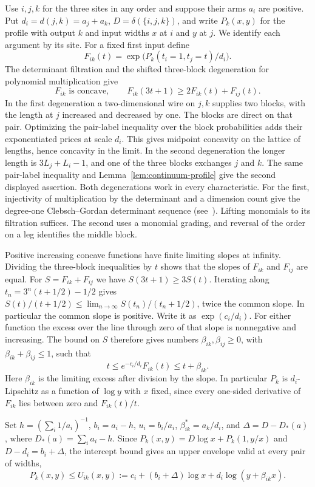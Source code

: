 Use $i,j,k$ for the three sites in any order and suppose their arms $a_i$
are positive. Put $d_i=d(j,k)=a_j+a_k$, $D=\delta(\{i,j,k\})$, and
write $P_k(x,y)$ for the profile with output $k$ and input widths $x$ at
$i$ and $y$ at $j$. We identify each argument by its site.
For a fixed first input define
\[
 F_{ik}(t)=\exp\bigl(P_k(t_i=1,t_j=t)/d_i\bigr).
\]
The determinant filtration and the shifted three-block degeneration for
polynomial multiplication \cite[proofs of Lemmas~4.1 and~4.2]{nine} give
\[
 F_{ik}\text{ is concave},\qquad
 F_{ik}(3t+1)\ge 2F_{ik}(t)+F_{ij}(t).
\]
In the first degeneration a two-dimensional wire on $j,k$ supplies two
blocks, with the length at $j$ increased and decreased by one. The blocks
are direct on that pair. Optimizing the pair-label inequality over the
block probabilities adds their exponentiated prices at scale $d_i$.
This gives midpoint concavity on the lattice of lengths, hence concavity
in the limit. In the second degeneration the longer length is
$3L_j+L_i-1$, and one of the three blocks exchanges $j$ and $k$. The same
pair-label inequality and Lemma~\ref{lem:continuum-profile} give the second
displayed assertion. Both degenerations work in every characteristic.
For the first, injectivity of multiplication by the determinant and
a dimension count give the degree-one Clebsch--Gordan determinant
sequence (see~\cite{kowalski}). Lifting monomials to its filtration
suffices. The second uses a monomial grading, and reversal of the order
on a leg identifies the middle block.

Positive increasing concave functions have finite limiting slopes at
infinity. Dividing the three-block inequalities by $t$ shows that the
slopes of $F_{ik}$ and $F_{ij}$ are equal. For $S=F_{ik}+F_{ij}$ we have
$S(3t+1)\ge3S(t)$. Iterating along
$t_n=3^n(t+1/2)-1/2$ gives
$S(t)/(t+1/2)\le \lim_{n\to\infty}S(t_n)/(t_n+1/2)$, twice the common slope. In particular the common slope is positive. Write it as
$\exp(c_i/d_i)$.
For either function the excess over the line through zero of that slope
is nonnegative and increasing. The bound on $S$ therefore gives numbers
$\beta_{ik},\beta_{ij}\ge0$, with $\beta_{ik}+\beta_{ij}\le1$, such that
\[
 t\le e^{-c_i/d_i}F_{ik}(t)\le t+\beta_{ik}.
\]
Here $\beta_{ik}$ is the limiting excess after division by the slope.
In particular $P_k$ is $d_i$-Lipschitz as a function of $\log y$ with $x$
fixed, since every one-sided derivative of $F_{ik}$ lies between zero and
$F_{ik}(t)/t$.

Set $h=(\sum_i1/a_i)^{-1}$, $b_i=a_i-h$, $u_i=b_i/a_i$,
$\beta_{ik}^*=a_k/d_i$, and $\Delta=D-D_*(a)$, where
$D_*(a)=\sum_i a_i-h$. Since $P_k(x,y)=D\log x+P_k(1,y/x)$
and $D-d_i=b_i+\Delta$, the intercept bound gives an upper envelope
valid at every pair of widths,
\begin{equation}\label{eq:profile-upper}
 P_k(x,y)\le U_{ik}(x,y):=c_i+(b_i+\Delta)\log x+d_i\log(y+\beta_{ik}x).
\end{equation}

